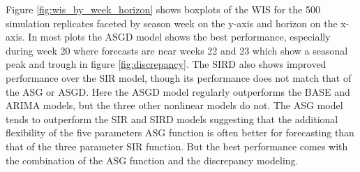





Figure \ref{fig:wis_by_week_horizon} shows 
boxplots of the WIS for the 500 simulation replicates faceted by season week 
on the y-axis and horizon on the x-axis. 
In most plots the ASGD model shows the best performance, 
especially during week 20 where
forecasts are near weeks 22 and 23 which show a seasonal peak and trough in 
figure \ref{fig:discrepancy}. The SIRD also shows improved performance over the
SIR model, though its performance does not match that of the ASG or ASGD.
Here the ASGD model regularly outperforms
the BASE and ARIMA models, but the three other nonlinear models do not. 
The ASG model
tends to outperform the SIR and SIRD models suggesting that the additional 
flexibility of the five parameters ASG function 
is often better for forecasting than that of the three parameter SIR function.
But the best performance comes with the combination of the ASG function and
the discrepancy modeling.



